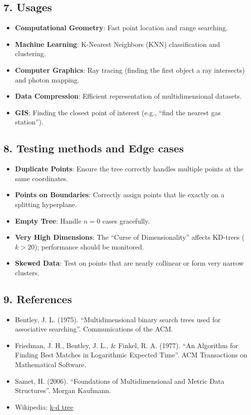 \subsection{7. Usages}
\begin{itemize}
    \item \textbf{Computational Geometry}: Fast point location and range searching.
    \item \textbf{Machine Learning}: K-Nearest Neighbors (KNN) classification and clustering.
    \item \textbf{Computer Graphics}: Ray tracing (finding the first object a ray intersects) and photon mapping.
    \item \textbf{Data Compression}: Efficient representation of multidimensional datasets.
    \item \textbf{GIS}: Finding the closest point of interest (e.g., ``find the nearest gas station'').
\end{itemize}

\subsection{8. Testing methods and Edge cases}
\begin{itemize}
    \item \textbf{Duplicate Points}: Ensure the tree correctly handles multiple points at the same coordinates.
    \item \textbf{Points on Boundaries}: Correctly assign points that lie exactly on a splitting hyperplane.
    \item \textbf{Empty Tree}: Handle $n=0$ cases gracefully.
    \item \textbf{Very High Dimensions}: The ``Curse of Dimensionality'' affects KD-trees ($k > 20$); performance should be monitored.
    \item \textbf{Skewed Data}: Test on points that are nearly collinear or form very narrow clusters.
\end{itemize}

\subsection{9. References}
\begin{itemize}
    \item Bentley, J. L. (1975). ``Multidimensional binary search trees used for associative searching''. Communications of the ACM.
    \item Friedman, J. H., Bentley, J. L., \& Finkel, R. A. (1977). ``An Algorithm for Finding Best Matches in Logarithmic Expected Time''. ACM Transactions on Mathematical Software.
    \item Samet, H. (2006). ``Foundations of Multidimensional and Metric Data Structures''. Morgan Kaufmann.
    \item Wikipedia: \href{https://en.wikipedia.org/wiki/K-d_tree}{k-d tree}
\end{itemize}

